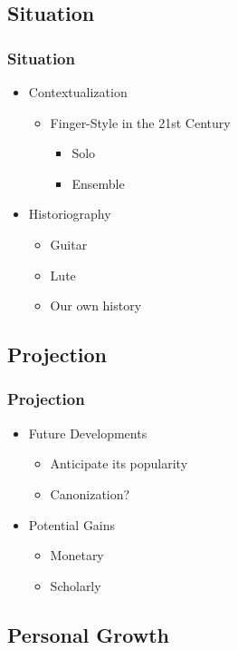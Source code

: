 \documentclass[xetex,mathserif,14pt]{beamer}
\begin{document}
\subsection{Situation}
\begin{frame}
  \frametitle{Situation}
  \begin{itemize}
  \item<1-> Contextualization
    \begin{itemize}
    \item<2-> Finger-Style in the 21st Century
      \begin{itemize}
      \item<3-> Solo
      \item<3-> Ensemble
      \end{itemize}
    \end{itemize}
  \item<4-> Historiography
    \begin{itemize}
    \item<5-> Guitar
    \item<5-> Lute
    \item<5-> Our own history
    \end{itemize}
  \end{itemize}
\end{frame}

\subsection{Projection}

\begin{frame}
  \frametitle{Projection}
  \begin{itemize}
  \item<1-> Future Developments
    \begin{itemize}
    \item<2-> Anticipate its popularity
    \item<2-> Canonization?
    \end{itemize}
  \item<1-> Potential Gains
    \begin{itemize}
    \item<3-> Monetary
    \item<3-> Scholarly
    \end{itemize}
  \end{itemize}
\end{frame}

\subsection{Personal Growth}
\end{document}
